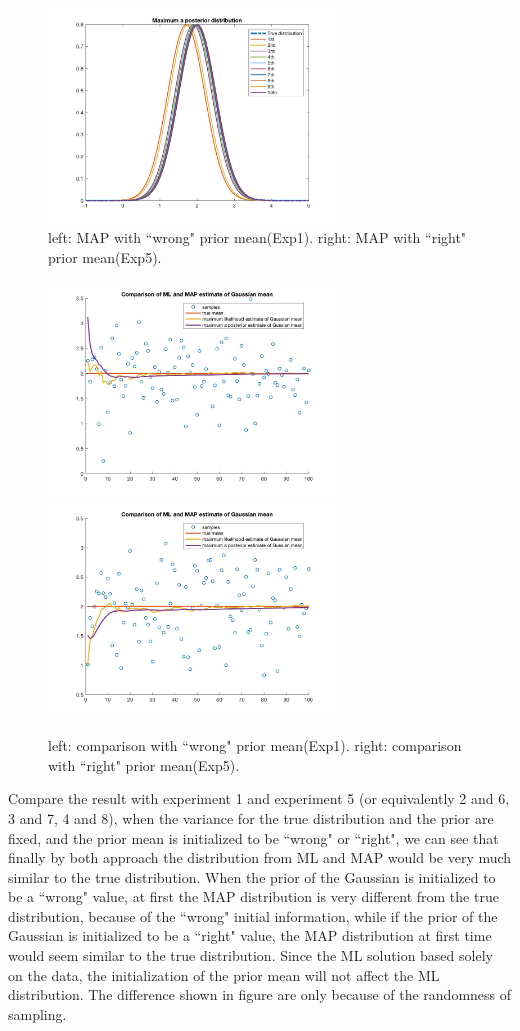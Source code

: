 \documentclass[a4paper]{article}
\begin{document}
\begin{spacing}{2.0}
\begin{itemize}
\begin{figure}[H]
	\includegraphics[width=3in]{MAP5.jpg}
	\caption{left: MAP with ``wrong" prior mean(Exp1). right: MAP with ``right" prior mean(Exp5).}
	\label{fig:side:b}
\end{figure}
\begin{figure}[H]
	\centering
	\includegraphics[width=3in]{100comparison1.jpg}
	\includegraphics[width=3in]{100comparison5.jpg}
	\caption{left: comparison with ``wrong" prior mean(Exp1). right: comparison with ``right" prior mean(Exp5).}
	\label{fig:side:b}
\end{figure}
Compare the result with experiment 1 and experiment 5 (or equivalently 2 and 6, 3 and 7, 4 and 8), when the variance for the true distribution and the prior are fixed, and the prior mean is initialized to be ``wrong" or ``right", we can see that finally by both approach the distribution from ML and MAP would be very much similar to the true distribution. When the prior of the Gaussian is initialized to be a ``wrong" value, at first the MAP distribution is very different from the true distribution, because of the ``wrong" initial information, while if the prior of the Gaussian is initialized to be a ``right" value, the MAP distribution at first time would seem similar to the true distribution. Since the ML solution based solely on the data, the initialization of the prior mean will not affect the ML distribution. The difference shown in figure are only because of the randomness of sampling.\\


\end{itemize}
\end{spacing}
\end{document}

